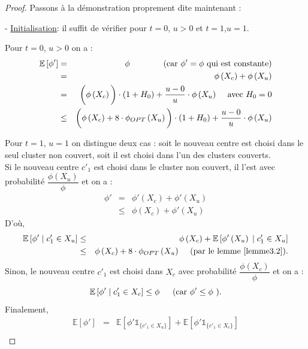 \documentclass[12pt,a4paper]{book}
\newcommand{\E}{\mathbb{E}}
\newcommand{\1}{\mathds{1}}
\begin{document}
\begin{proof}
		Passons à la démonstration proprement dite maintenant : \\
		\item[-] \underline{Initialisation}: il suffit de vérifier pour $t=0$, $u > 0$ et $t=1$,$u=1$.
		 \item Pour $t=0$, $u>0$ on a :
		 \begin{eqnarray*}		 
			\E\left[\phi'\right] &=& \phi \textrm{ \; \; \; \; \; \; (car $\phi'= \phi$ qui est constante)}\\
			&=&	\phi \left( X_c \right) + \phi \left( X_u \right)	\\
			&=& \bigg( \phi \left( X_c \right) \bigg) \cdot \left( 1 + H_0 \right) + \frac{u-0}{u} \cdot \phi \left( X_u \right) \textrm{\; \; avec $H_0=0$}	\\
			& \leq & \bigg( \phi \left( X_c \right) + 8 \cdot \phi_{OPT} \left( X_u \right) \bigg) \cdot \left( 1 + H_0 \right) + \frac{u-0}{u} \cdot \phi \left( X_u \right)		
		 \end{eqnarray*}
		 \item Pour $t=1$, $u=1$ on distingue deux cas : soit le nouveau centre est choisi dans le seul cluster non couvert, soit il est choisi dans l'un des clusters couverts.\\
		 Si le nouveau centre $c'_1$ est choisi dans le cluster non couvert, il l'est avec probabilité $\dfrac{\phi \left( X_u \right)}{\phi}$ et on a :
		 \begin{eqnarray*}
		 	\phi' &=& \phi' \left( X_c \right) + \phi' \left( X_u \right) \\
		 	& \leq & \phi \left( X_c \right) + \phi' \left( X_u \right)
		 \end{eqnarray*}
		 D'où,
		 \begin{eqnarray*}
		 	\E\left[\phi' \; | \; c'_1 \in X_u \right] & \leq & \phi \left( X_c \right) + \E \left[ \phi' \left( X_u \right) \; | \; c'_1 \in X_u \right] \\
		 	& \leq & \phi \left( X_c \right) + 8 \cdot \phi_{OPT} \left( X_u \right) \textrm{\; \; (par le lemme \ref{lemme3.2}).}
		 \end{eqnarray*}
		 Sinon, le nouveau centre $c'_1$ est choisi dans $X_c$ avec probabilité  $\dfrac{\phi \left( X_c \right)}{\phi}$ et on a :
		 $$
		 	\E\left[\phi' \; | \; c'_1 \in X_c \right] \leq \phi \textrm{ \; \; (car $\phi' \leq \phi$ ).} 
		 $$
		 Finalement,
		 \begin{eqnarray*}
		 	\E\left[\phi'\right] &=& \E\left[\phi' \1_{\{c'_1 \in X_u\}} \right] + \E\left[\phi' \1_{\{c'_1 \in X_c\}} \right] \\

\end{eqnarray*}
\end{proof}
\end{document}
